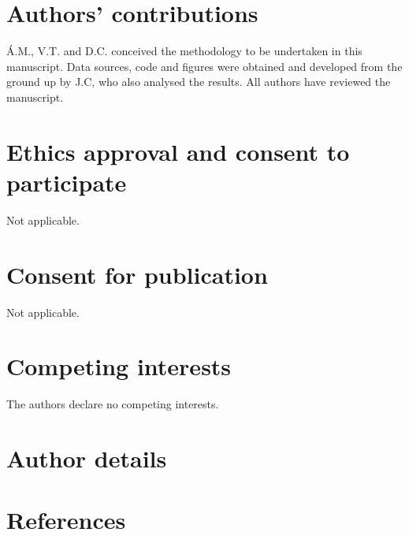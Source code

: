\documentclass[article,10pt,twocolumn]{wlscirep}
\begin{document}
\section{Authors' contributions} \label{sec-authors-contributions}

Á.M., V.T. and D.C. conceived the methodology to be undertaken in this manuscript. Data sources, code and figures were obtained and developed from the ground up by J.C, who also analysed the results. All authors have reviewed the manuscript.

\section{Ethics approval and consent to participate} \label{sec-ethics-approval}
Not applicable.

\section{Consent for publication} \label{sec-consent-for-publication}
Not applicable.

\section{Competing interests} \label{sec-competing-interests}
The authors declare no competing interests.

\section{Author details} \label{sec-author-details}

\section{References} \label{sec-references}

% 
\end{document}
